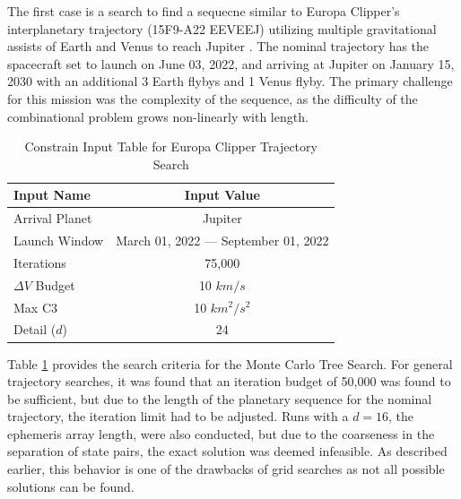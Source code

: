 \documentclass[letterpaper, preprint, paper,11pt]{AAS}	%
\begin{document}
The first case is a search to find a sequecne similar to Europa Clipper's interplanetary trajectory (15F9-A22 EEVEEJ) utilizing multiple gravitational assists of Earth and Venus to reach Jupiter \cite{Buffington2014}. The nominal trajectory has the spacecraft set to launch on June 03, 2022, and arriving at Jupiter on January 15, 2030 with an additional 3 Earth flybys and 1 Venus flyby. The primary challenge for this mission was the complexity of the sequence, as the difficulty of the combinational problem grows non-linearly with length.
\begin{table}[htb]
    \centering
    \caption{Constrain Input Table for Europa Clipper Trajectory Search}
    \label{table:clipInputs}
    \begin{tabular}{lc}
        \toprule
        \textbf{Input Name} & \textbf{Input Value}\\
        \midrule
        Arrival Planet & Jupiter \\
        Launch Window & March 01, 2022 --- September 01, 2022 \\
        Iterations & 75,000 \\ 
        $\Delta V$ Budget & 10 $km/s$ \\
        Max C3 & 10 $km^2/s^2$ \\
        Detail ($d$) & 24 \\
        \bottomrule
    \end{tabular}
\end{table}


Table \ref*{table:clipInputs} provides the search criteria for the Monte Carlo Tree Search. For general trajectory searches, it was found that an iteration budget of 50,000 was found to be sufficient, but due to the length of the planetary sequence for the nominal trajectory, the iteration limit had to be adjusted. Runs with a $d = 16$, the ephemeris array length, were also conducted, but due to the coarseness in the separation of state pairs, the exact solution was deemed infeasible. As described earlier, this behavior is one of the drawbacks of grid searches as not all possible solutions can be found. 
\end{document}
